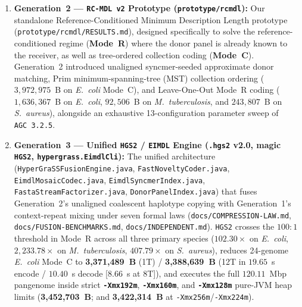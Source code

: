 \documentclass[10pt]{article}
\theoremstyle{definition}
\begin{document}
\begin{enumerate}
\begin{itemize}
  \end{itemize}
  While Generation~1 reduced the 24-genome \textit{E.~coli} pangenome from $9,215,764$~B (default $4$~MiB bank / $2$~MiB blocks) to $4,885,851$~B (\texttt{--pangenome} $16$~MiB bank / $8$~MiB blocks) and further to \textbf{3,810,409~B} ($0.254$~bpb) with LZ77+range gap coding, its byte-by-byte context-mixed anchor pages required $887.45$~s and $1,452$~MB JVM RSS on the full pangenome, and our 8-channel entropy-floor decomposition (\texttt{docs/ENTROPY-FLOOR.md}) proved that self-contained Mode~C archives cannot cross $100:1$ ($1.20$~MB) because the irreducible first-genome anchor alone requires $2,257,234$~B ($1.88\times$ the entire $100:1$ budget).
  \item \textbf{Generation~2 --- \texttt{RC-MDL v2} Prototype (\texttt{prototype/rcmdl}):} Our standalone Reference-Conditioned Minimum Description Length prototype (\texttt{prototype/rcmdl/RESULTS.md}), designed specifically to solve the reference-conditioned regime (\textbf{Mode~R}) where the donor panel is already known to the receiver, as well as tree-ordered collection coding (\textbf{Mode~C}). Generation~2 introduced unaligned syncmer-seeded approximate donor matching, Prim minimum-spanning-tree (MST) collection ordering ($3,972,975$~B on \textit{E.~coli} Mode~C), and Leave-One-Out Mode~R coding ($1,636,367$~B on \textit{E.~coli}, $92,506$~B on \textit{M.~tuberculosis}, and $243,807$~B on \textit{S.~aureus}), alongside an exhaustive 13-configuration parameter sweep of \texttt{AGC~3.2.5}.
  \item \textbf{Generation~3 --- Unified \texttt{HGS2} / \texttt{EIMDL} Engine (\texttt{.hgs2} v2.0, magic \texttt{HGS2}, \texttt{hypergrass.EimdlCli}):} The unified architecture (\texttt{HyperGraSSFusionEngine.java}, \texttt{FastNoveltyCoder.java}, \texttt{EimdlMosaicCodec.java}, \texttt{EimdlSyncmerIndex.java}, \texttt{FastaStreamFactorizer.java}, \texttt{DonorPanelIndex.java}) that fuses Generation~2's unaligned coalescent haplotype copying with Generation~1's context-repeat mixing under seven formal laws (\texttt{docs/COMPRESSION-LAW.md}, \texttt{docs/FUSION-BENCHMARKS.md}, \texttt{docs/INDEPENDENT.md}). \texttt{HGS2} crosses the $100:1$ threshold in Mode~R across all three primary species ($102.30\times$ on \textit{E.~coli}, $2,233.78\times$ on \textit{M.~tuberculosis}, $407.79\times$ on \textit{S.~aureus}), reduces 24-genome \textit{E.~coli} Mode~C to \textbf{3,371,489~B} (1T) / \textbf{3,388,639~B} (12T in $19.65$~s encode / $10.40$~s decode [$8.66$~s at 8T]), and executes the full $120.11$~Mbp pangenome inside strict \textbf{\texttt{-Xmx192m}}, \textbf{\texttt{-Xmx160m}}, and \textbf{\texttt{-Xmx128m}} pure-JVM heap limits (\textbf{3,452,703~B}; and \textbf{3,422,314~B} at \texttt{-Xmx256m}/\texttt{-Xmx224m}).

\end{enumerate}
\end{document}
